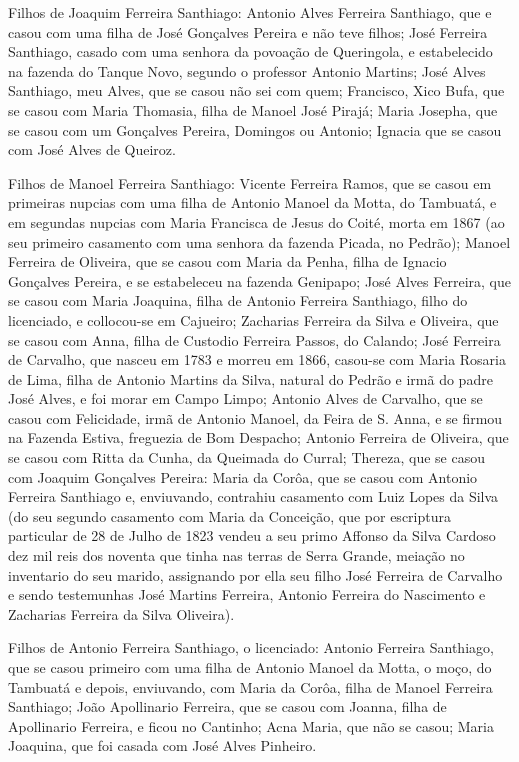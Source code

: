 Filhos de Joaquim Ferreira Santhiago: Antonio Alves Ferreira Santhiago, que e casou com uma filha de José Gonçalves Pereira e não teve filhos; José Ferreira Santhiago, casado com uma senhora da povoação de Queringola, e estabelecido na fazenda do Tanque Novo, segundo o professor Antonio Martins; José Alves Santhiago, meu Alves, que se casou não sei com quem; Francisco, Xico Bufa, que se casou com Maria Thomasia, filha de Manoel José Pirajá; Maria Josepha, que se casou com um Gonçalves Pereira, Domingos ou Antonio; Ignacia que se casou com José Alves de Queiroz.

Filhos de Manoel Ferreira Santhiago: Vicente Ferreira Ramos, que se casou em primeiras nupcias com uma filha de Antonio Manoel da Motta, do Tambuatá, e em segundas nupcias com Maria Francisca de Jesus do Coité, morta em 1867 (ao seu primeiro casamento com uma senhora da fazenda Picada, no Pedrão); Manoel Ferreira de Oliveira, que se casou com Maria da Penha, filha de Ignacio Gonçalves Pereira, e se estabeleceu na fazenda Genipapo; José Alves Ferreira, que se casou com Maria Joaquina, filha de Antonio Ferreira Santhiago, filho do licenciado, e collocou-se em Cajueiro; Zacharias Ferreira da Silva e Oliveira, que se casou com Anna, filha de Custodio Ferreira Passos, do Calando; José Ferreira de Carvalho, que nasceu em 1783 e morreu em 1866, casou-se com Maria Rosaria de Lima, filha de Antonio Martins da Silva, natural do Pedrão e irmã do padre José Alves, e foi morar em Campo Limpo; Antonio Alves de Carvalho, que se casou com Felicidade, irmã de Antonio Manoel, da Feira de S. Anna, e se firmou na Fazenda Estiva, freguezia de Bom Despacho; Antonio Ferreira de Oliveira, que se casou com Ritta da Cunha, da Queimada do Curral; Thereza, que se casou com Joaquim Gonçalves Pereira: Maria da Corôa, que se casou com Antonio Ferreira Santhiago e, enviuvando, contrahiu casamento com Luiz Lopes da Silva (do seu segundo casamento com Maria da Conceição, que por escriptura particular de 28 de Julho de 1823 vendeu a seu primo Affonso da Silva Cardoso dez mil reis dos noventa que tinha nas terras de Serra Grande, meiação no inventario do seu marido, assignando por ella seu filho José Ferreira de Carvalho\label{jfcarvalho} e sendo testemunhas José Martins Ferreira, Antonio Ferreira do Nascimento e Zacharias Ferreira da Silva Oliveira).

Filhos de Antonio Ferreira Santhiago, o licenciado: Antonio Ferreira Santhiago, que se casou primeiro com uma filha de Antonio Manoel da Motta, o moço, do Tambuatá e depois, enviuvando, com Maria da Corôa, filha de Manoel Ferreira Santhiago; João Apollinario Ferreira, que se casou com Joanna, filha de Apollinario Ferreira, e ficou no Cantinho;
Acna Maria, que não se casou; Maria Joaquina, que foi casada com José Alves Pinheiro.

